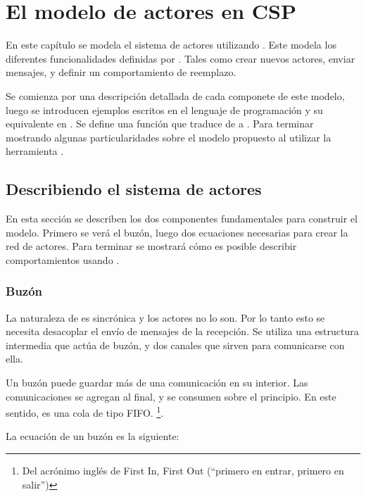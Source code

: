 \chapter{El modelo de actores en CSP}
En este capítulo se modela el sistema de actores utilizando \CSP. Este modela los diferentes funcionalidades definidas por \SAL. Tales como crear nuevos actores, enviar mensajes, y definir un comportamiento de reemplazo. 

Se comienza por una descripción detallada de cada componete de este modelo, luego se introducen ejemplos escritos en el lenguaje de programación \SAL y su equivalente en \CSP. Se define una función que traduce de \SAL a \CSP. Para terminar mostrando algunas particularidades sobre el modelo propuesto al utilizar la herramienta \FDR.

\section{Describiendo el sistema de actores} 
En esta sección se describen los dos componentes fundamentales para construir el modelo. Primero se verá el buzón, luego dos ecuaciones necesarias para crear la red de actores. Para terminar se mostrará cómo es posible describir comportamientos usando \CSP. 


\subsection{Buzón}\label{modelo:buzon}

La naturaleza de \CSP es sincrónica y los actores no lo son. Por lo tanto esto se necesita desacoplar el envío de mensajes de la recepción. Se utiliza una estructura intermedia que actúa de buzón, y dos canales que sirven para comunicarse con ella.

Un buzón puede guardar más de una comunicación en su interior. Las comunicaciones se agregan al final, y se consumen sobre el principio. En este sentido, es una cola de tipo FIFO. \footnote{Del acrónimo inglés de First In, First Out (``primero en entrar, primero en salir'')}.

La ecuación de un buzón es la siguiente:


